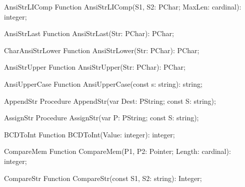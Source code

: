  
\begin{function}{AnsiStrLIComp}
\Declaration
Function AnsiStrLIComp(S1, S2: PChar; MaxLen: cardinal): integer;
\Description
\Errors
\SeeAlso
\end{function}

 
\begin{function}{AnsiStrLast}
\Declaration
Function AnsiStrLast(Str: PChar): PChar;
\Description
\Errors
\SeeAlso
\end{function}

 
\begin{function}{CharAnsiStrLower}
\Declaration
Function AnsiStrLower(Str: PChar): PChar;
\Description
\Errors
\SeeAlso
\end{function}

 
\begin{function}{AnsiStrUpper}
\Declaration
Function AnsiStrUpper(Str: PChar): PChar;
\Description
\Errors
\SeeAlso
\end{function}

 
\begin{function}{AnsiUpperCase}
\Declaration
Function AnsiUpperCase(const s: string): string;
\Description
\Errors
\SeeAlso
\end{function}

 
\begin{procedure}{AppendStr}
\Declaration
Procedure AppendStr(var Dest: PString; const S: string);
\Description
\Errors
\SeeAlso
\end{procedure}

 
\begin{procedure}{AssignStr}
\Declaration
Procedure AssignStr(var P: PString; const S: string);
\Description
\Errors
\SeeAlso
\end{procedure}

 
\begin{function}{BCDToInt}
\Declaration
Function BCDToInt(Value: integer): integer;
\Description
\Errors
\SeeAlso
\end{function}

 
\begin{function}{CompareMem}
\Declaration
Function CompareMem(P1, P2: Pointer; Length: cardinal): integer;
\Description
\Errors
\SeeAlso
\end{function}

 
\begin{function}{CompareStr}
\Declaration
Function CompareStr(const S1, S2: string): Integer;
\Description
\Errors
\SeeAlso
\end{function}

